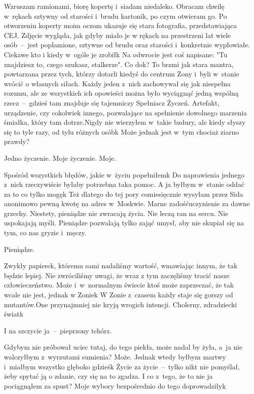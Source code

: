 \documentclass[../MAIN.tex]{subfiles}
\begin{document}
Wzruszam ramionami, biorę kopertę i~siadam niedaleko. Obracam
chwilę w~rękach sztywny od starości i~brudu kartonik, po czym
otwieram go.
%
%
Po otworzeniu koperty moim oczom ukazuje się stara fotografia,
przedstawiająca CEJ. Zdjęcie wygląda, jak gdyby miało je w
rękach na przestrzeni lat wiele osób~--~jest poplamione,
sztywne
od brudu oraz starości i~konkretnie wypłowiałe. Ciekawe kto i
kiedy w~ogóle je zrobił\3k Na odwrocie jest coś napisane: "Tu
znajdziesz to, czego szukasz, stalkerze". Co do\3k? To brzmi
jak stara mantra, powtarzana przez tych, którzy dotarli kiedyś
do centrum Zony i~byli w~stanie wrócić o własnych siłach. Każdy
jeden z~nich zachowywał się jak niespełna rozumu, ale ze
wszystkich ich opowieści można było wyciągnąć jedną wspólną
rzecz~--~gdzieś tam znajduje się tajemniczy Spełniacz Życzeń.
Artefakt, urządzenie, czy cokolwiek innego, pozwalające na
spełnienie dowolnego marzenia śmiałka, który tam dotrze.Nigdy
nie wierzyłem w~takie bzdury, ale kiedy słyszy się to tyle
razy, od tylu różnych osób\3k Może jednak jest w~tym chociaż
ziarno prawdy?

Jedno życzenie. Moje życzenie. Moje.

Spośród wszystkich błędów, jakie w~życiu popełniłem\3k Do
naprawienia jednego z~nich rzeczywiście byłaby potrzebna taka
pomoc. A ja byłbym w~stanie oddać za to co tylko mogę\3k Też
dlatego do tej pory comiesięcznie wysyłam przez Sida anonimowo
pewną kwotę na adres w~Moskwie. Marne zadośćuczynienie za dawne
grzechy. Niestety, pieniądze nie zwracają życia. Nie leczą ran
na sercu. Nie uspokajają myśli. Pieniądze pozwalają tylko zająć
umysł, aby nie skupiał się na tym, co nas gryzie i~męczy.

Pieniądze.

Zwykły papierek, któremu sami nadaliśmy wartość, wmawiając
innym, że tak będzie lepiej. Nie zwróciliśmy uwagi, że wraz z
tym zaczęliśmy tracić nasze człowieczeństwo. Może i~w~normalnym
świecie ktoś może zaprzeczać, że tak wcale nie jest, jednak w
Zonie\3k W Zonie z~czasem każdy staje się gorszy od
mutantów.One przynajmniej nie kryją wrogich intencji. Cholerny,
zdradziecki świat\3k

I na szczycie ja~--~pieprzony tchórz.

Gdybym nie próbował uciec tutaj, do tego piekła, może nadal by
żyła, a~ja nie walczyłbym z~wyrzutami sumienia? Może. Jednak
wtedy byłbym martwy i~miałbym wszystko głęboko gdzieś\3k Życie
za życie~--~tylko nikt nie pomyślał, żeby spytać ją o zdanie,
czy się na to zgadza. I co z~tego, że to nie ja pociągnąłem za
spust? Moje wybory bezpośrednio do tego doprowadziły\3k
\end{document}
